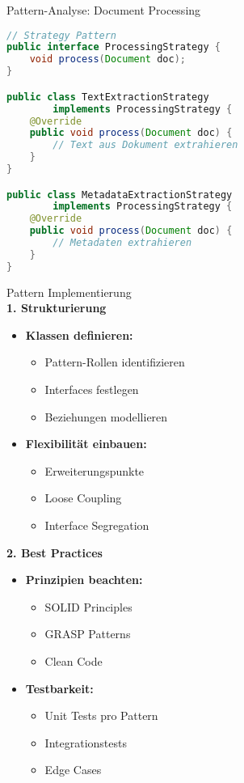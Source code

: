 \begin{example2}{Pattern-Analyse: Document Processing}
\begin{lstlisting}[language=Java, style=basesmol]
// Strategy Pattern
public interface ProcessingStrategy {
    void process(Document doc);
}

public class TextExtractionStrategy 
        implements ProcessingStrategy {
    @Override
    public void process(Document doc) {
        // Text aus Dokument extrahieren
    }
}

public class MetadataExtractionStrategy 
        implements ProcessingStrategy {
    @Override
    public void process(Document doc) {
        // Metadaten extrahieren
    }
}
\end{lstlisting}
\end{example2}

\begin{KR}{Pattern Implementierung}\\
\textbf{1. Strukturierung}
\begin{itemize}
    \item \textbf{Klassen definieren:}
    \begin{itemize}
        \item Pattern-Rollen identifizieren
        \item Interfaces festlegen
        \item Beziehungen modellieren
    \end{itemize}
    
    \item \textbf{Flexibilität einbauen:}
    \begin{itemize}
        \item Erweiterungspunkte
        \item Loose Coupling
        \item Interface Segregation
    \end{itemize}
\end{itemize}

\textbf{2. Best Practices}
\begin{itemize}
    \item \textbf{Prinzipien beachten:}
    \begin{itemize}
        \item SOLID Principles
        \item GRASP Patterns
        \item Clean Code
    \end{itemize}
    
    \item \textbf{Testbarkeit:}
    \begin{itemize}
        \item Unit Tests pro Pattern
        \item Integrationstests
        \item Edge Cases
    \end{itemize}
\end{itemize}
\end{KR}

